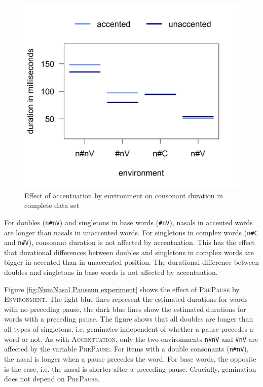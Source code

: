 \begin{figure} [h!]
	\centering
	\includegraphics [scale=0.5] {images/Experiment/unModelCompleteInterEnvAcc}
	
	\caption{Effect of accentuation by environment on consonant duration in complete data set}
	\label{fig:NumNasal Acc un experiment}
\end{figure}


 For  doubles (\texttt{n\#nV}) and singletons in base words (\texttt{\#nV}), nasals in accented words are longer than nasals in unaccented words.
For singletons in complex words (\texttt{n\#C} and \texttt{n\#V}), consonant duration is not affected by accentuation. This has the effect that durational differences between doubles and singletons in complex words are bigger in accented than in unaccented position. The durational difference between doubles and singletons in base words is not affected by accentuation.







Figure \ref{fig:NumNasal Pauseun experiment} shows the effect of \textsc{PrePause} by \textsc{Environment}. The light blue lines represent the estimated durations for words with no preceding pause, the dark blue lines show the estimated durations for words with a preceding pause. 
The figure shows that all doubles are longer than all types of singletons, i.e.  geminates independent of whether a pause precedes a word or not.
As with \textsc{Accentuation}, only the two environments \texttt{n\#nV} and \texttt{\#nV} are affected by the variable \textsc{PrePause}. For items with a double consonants (\texttt{n\#nV}), the nasal is longer when a pause precedes the word. For base words, the opposite is the case, i.e. the nasal is shorter after a preceding pause.
Crucially, gemination does not depend on \textsc{PrePause}. 

